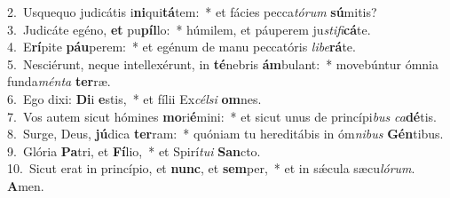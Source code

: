 {2.~}Usquequo judicátis i\textbf{ni}qui\textbf{tá}tem:~* et fácies pecca\textit{tó}\textit{rum} \textbf{sú}mitis?\\
{3.~}Judicáte egéno, \textbf{et} pu\textbf{píl}lo:~* húmilem, et páuperem ju\textit{sti}\textit{fi}\textbf{cá}te.\\
{4.~}E\textbf{rí}pite \textbf{páu}perem:~* et egénum de manu peccatóris \textit{li}\textit{be}\textbf{rá}te.\\
{5.~}Nesciérunt, neque intellexérunt, in \textbf{té}nebris \textbf{ám}bulant:~* movebúntur ómnia funda\textit{mén}\textit{ta} \textbf{ter}ræ.\\
{6.~}Ego dixi: \textbf{Di}i \textbf{e}stis,~* et fílii Ex\textit{cél}\textit{si} \textbf{om}nes.\\
{7.~}Vos autem sicut hómines \textbf{mo}ri\textbf{é}mini:~* et sicut unus de princípi\textit{bus} \textit{ca}\textbf{dé}tis.\\
{8.~}Surge, Deus, \textbf{jú}dica \textbf{ter}ram:~* quóniam tu hereditábis in óm\textit{ni}\textit{bus} \textbf{Gén}tibus.\\
{9.~}Glória \textbf{Pa}tri, et \textbf{Fí}lio,~* et Spirí\textit{tu}\textit{i} \textbf{San}cto.\\
{10.~}Sicut erat in princípio, et \textbf{nunc}, et \textbf{sem}per,~* et in sǽcula sæcu\textit{ló}\textit{rum}. \textbf{A}men.\\
